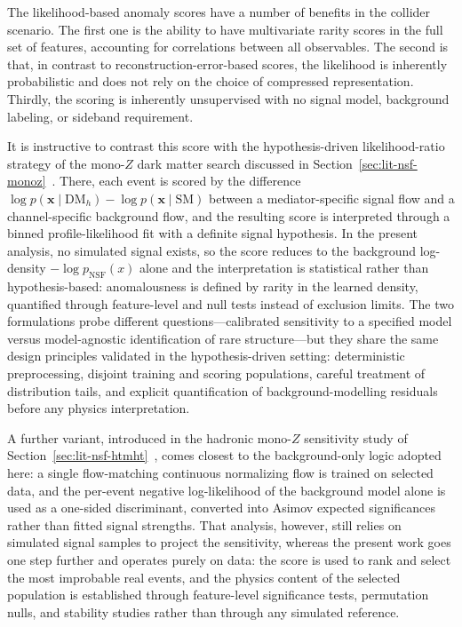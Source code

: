 \documentclass[11pt,a4paper,twocolumn]{article}
\begin{document}
The likelihood-based anomaly scores have a number of benefits in the collider scenario. The first one is the ability to have multivariate rarity scores in the full set of features, accounting for correlations between all observables. The second is that, in contrast to reconstruction-error-based scores, the likelihood is inherently probabilistic and does not rely on the choice of compressed representation. Thirdly, the scoring is inherently unsupervised with no signal model, background labeling, or sideband requirement.

It is instructive to contrast this score with the hypothesis-driven likelihood-ratio strategy of the mono-$Z$ dark matter search discussed in Section~\ref{sec:lit-nsf-monoz}~\cite{Rasineni2026MonoZNSF}. There, each event is scored by the difference $\log p(\mathbf{x}\mid\mathrm{DM}_h) - \log p(\mathbf{x}\mid\mathrm{SM})$ between a mediator-specific signal flow and a channel-specific background flow, and the resulting score is interpreted through a binned profile-likelihood fit with a definite signal hypothesis. In the present analysis, no simulated signal exists, so the score reduces to the background log-density $-\log p_{\mathrm{NSF}}(x)$ alone and the interpretation is statistical rather than hypothesis-based: anomalousness is defined by rarity in the learned density, quantified through feature-level and null tests instead of exclusion limits. The two formulations probe different questions---calibrated sensitivity to a specified model versus model-agnostic identification of rare structure---but they share the same design principles validated in the hypothesis-driven setting: deterministic preprocessing, disjoint training and scoring populations, careful treatment of distribution tails, and explicit quantification of background-modelling residuals before any physics interpretation.

A further variant, introduced in the hadronic mono-$Z$ sensitivity study of Section~\ref{sec:lit-nsf-htmht}~\cite{Rasineni2026HadronicFlowMatching}, comes closest to the background-only logic adopted here: a single flow-matching continuous normalizing flow is trained on selected data, and the per-event negative log-likelihood of the background model alone is used as a one-sided discriminant, converted into Asimov expected significances rather than fitted signal strengths. That analysis, however, still relies on simulated signal samples to project the sensitivity, whereas the present work goes one step further and operates purely on data: the score is used to rank and select the most improbable real events, and the physics content of the selected population is established through feature-level significance tests, permutation nulls, and stability studies rather than through any simulated reference.
\end{document}
